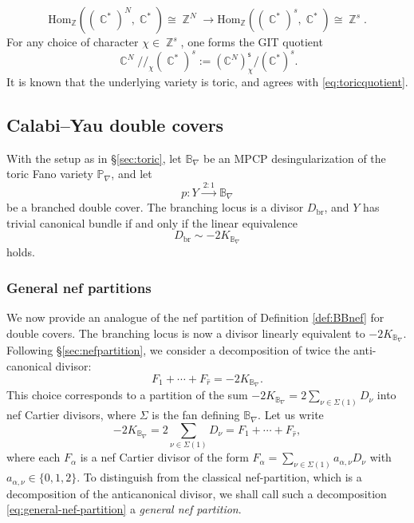 \documentclass[12pt,a4paper,oneside]{amsart}
\numberwithin{equation}{section}
\theoremstyle{definition}
\theoremstyle{remark}
\DeclareMathOperator{\C}{\mathbb{C}}
\DeclareMathOperator{\Z}{\mathbb{Z}}
\newcommand{\cB}{\mathbb{B}}
\begin{document}
\begin{equation*}
    \mathrm{Hom}_{\Z} ( (\C^{\ast})^N, \C^{\ast} ) \cong \Z^N \longrightarrow \mathrm{Hom}_{\Z} ( (\C^{\ast})^s, \C^{\ast} ) \cong \Z^s .
\end{equation*}
For any choice of character $\chi \in \Z^s $, one forms the GIT quotient 
\begin{equation}
    \C^N /\!\!/ _{\chi} (\C^{\ast})^s:=(\mathbb{C}^{N})_{\chi}^{\mathsf{s}}\slash 
(\mathbb{C}^{\ast})^{s}.
\end{equation}
It is known 
that the underlying variety is toric, and agrees with \eqref{eq:toricquotient}.






\subsection{Calabi--Yau double covers}
\label{sec:doublecover}
With the setup as in \S\ref{sec:toric}, let $\cB_{\nabla}$ be an MPCP desingularization of the toric Fano variety $\mathbb{P}_{\nabla}$, and let
\begin{equation*}
p\colon Y \xrightarrow{~2:1~}\cB_{\nabla} 
\end{equation*}
be a branched double cover. The branching locus is a divisor $D_{\mathrm{br}}$, and $Y$ has trivial canonical bundle if and only if the linear equivalence
\begin{equation*}
	D_{\mathrm{br}} \sim -2K_{\cB_{\nabla}} 
\end{equation*}
holds.\par


\subsubsection{General nef partitions}
We now provide an analogue of the nef partition of Definition \ref{def:BBnef} for double covers. 
The branching locus is now a divisor 
linearly equivalent to \(-2K_{\mathbb{B}_{\nabla}}\).
Following \S\ref{sec:nefpartition}, we consider a 
decomposition of twice the anti-canonical divisor:
\begin{equation*}
    F_1 + \cdots + F_{\hat{r}} = -2K_{\cB_{\nabla}}.
\end{equation*}
This choice corresponds to a partition of the sum \(
-2K_{\cB_{\nabla}}=2\sum_{\nu\in\Sigma(1)}D_{\nu}\)
into nef Cartier divisors, where \(\Sigma\) is the 
fan defining \(\mathbb{B}_{\nabla}\). Let us write
\begin{equation}
\label{eq:general-nef-partition}
-2K_{\cB_{\nabla}}=2\sum_{\nu\in\Sigma(1)}D_{\nu}
= F_1 + \cdots + F_{\hat{r}} ,
\end{equation}
where each \(F_{\alpha}\) is a nef Cartier divisor 
of the form \(F_{\alpha}=\sum_{\nu\in\Sigma(1)}a_{\alpha, \nu}D_{\nu}\)
with \(a_{\alpha, \nu}\in\{0,1,2\}\). To distinguish from 
the classical nef-partition, which is a decomposition
of the anticanonical divisor, we shall call such
a decomposition \eqref{eq:general-nef-partition}
a \emph{general nef partition}.
\end{document}
